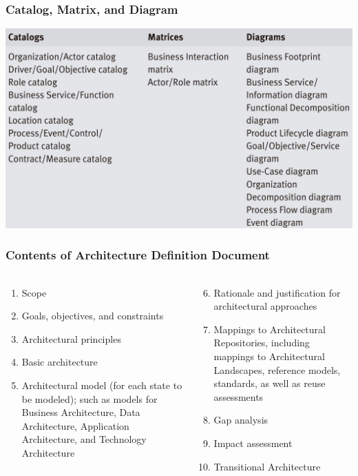 \documentclass[aspectratio=169, table]{beamer}
\begin{document}
{
    \begin{frame}
        \centering
        \frametitle{Catalog, Matrix, and Diagram}
        \includegraphics[width=.6\textwidth]{../figures/catalogs_matrices_diagrams.png}
    \end{frame}
}

\begin{frame}
    \frametitle{Contents of Architecture Definition Document}
     \framesubtitle{\hspace{1cm}}
    \begin{columns}
        \begin{column}{0.5\textwidth}
            \begin{center}
                \begin{enumerate}
                    \item Scope
                    \item Goals, objectives, and constraints
                    \item Architectural principles
                    \item Basic architecture
                    \item Architectural model (for each state to be modeled); such as models for Business Architecture, Data Architecture, Application Architecture, and Technology Architecture

                \end{enumerate}
            \end{center}
        \end{column}
        \begin{column}{0.5\textwidth}
            \begin{center}
                \begin{enumerate}
                    \setcounter{enumi}{5}
                    \item Rationale and justification for architectural approaches
                    \item Mappings to Architectural Repositories, including mappings to Architectural Landscapes, reference models, standards, as well as reuse assessments
                    \item Gap analysis
                    \item Impact assessment
                    \item Transitional Architecture
                \end{enumerate}
            \end{center}
        \end{column}
    \end{columns}
\end{frame}
\end{document}
